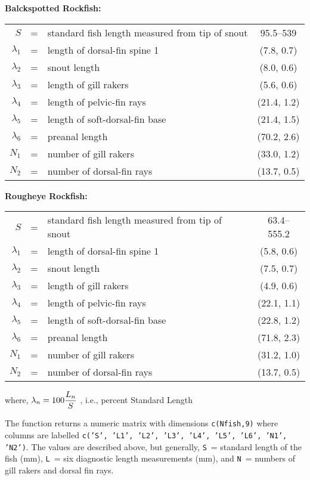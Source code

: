 \documentclass[letterpaper,12pt,fleqn]{article}
\def\tab{\hspace{0.5 in}}
\newcommand{\code}[1]{\small\texttt{#1}\normalsize}
\newcommand{\gfrac}[2]{\genfrac{}{}{}{0}{#1}{#2}}
\newcommand{\bold}[1]{{\bf #1}}
\begin{document}
\bold{Balckspotted Rockfish:}\\
\begin{tabular}{rllc}
    $S$         & = & standard fish length measured from tip of snout & 95.5--539\\
    $\lambda_1$ & = & length of dorsal-fin spine 1    & (7.8, 0.7)\\
    $\lambda_2$ & = & snout length                    & (8.0, 0.6)\\
    $\lambda_3$ & = & length of gill rakers           & (5.6, 0.6)\\
    $\lambda_4$ & = & length of pelvic-fin rays       & (21.4, 1.2)\\
    $\lambda_5$ & = & length of soft-dorsal-fin base  & (21.4, 1.5)\\
    $\lambda_6$ & = & preanal length                  & (70.2, 2.6)\\
    $N_1$       & = & number of gill rakers           & (33.0, 1.2)\\
    $N_2$       & = & number of dorsal-fin rays       & (13.7, 0.5)\\
\end{tabular}


\bold{Rougheye Rockfish:}\\
\begin{tabular}{rllc}
    $S$         & = & standard fish length measured from tip of snout & 63.4--555.2\\
    $\lambda_1$ & = & length of dorsal-fin spine 1    & (5.8, 0.6)\\
    $\lambda_2$ & = & snout length                    & (7.5, 0.7)\\
    $\lambda_3$ & = & length of gill rakers           & (4.9, 0.6)\\
    $\lambda_4$ & = & length of pelvic-fin rays       & (22.1, 1.1)\\
    $\lambda_5$ & = & length of soft-dorsal-fin base  & (22.8, 1.2)\\
    $\lambda_6$ & = & preanal length                  & (71.8, 2.3)\\
    $N_1$       & = & number of gill rakers           & (31.2, 1.0)\\
    $N_2$       & = & number of dorsal-fin rays       & (13.7, 0.5)\\
\end{tabular}

where, $\lambda_n = 100 \gfrac{L_n}{S}$ , i.e., percent Standard Length 

\tab The function returns a numeric matrix with dimensions \code{c(Nfish,9)} where columns are labelled 
  \code{c('S', 'L1', 'L2', 'L3', 'L4', 'L5', 'L6', 'N1', 'N2')}. 
The values are described above, but generally, \code{S}~= standard length of the fish (mm), \code{L}~= six diagnostic length measurements (mm),
and \code{N}~= numbers of gill rakers and dorsal fin rays.
\end{document}
